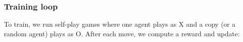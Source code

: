 \begin{Shaded}
\begin{Highlighting}[]
\OperatorTok{=}
        \NormalTok{:}
\OperatorTok{=}
             
\OperatorTok{=}
            \NormalTok{:}
\OperatorTok{=} \NormalTok{(}
\OperatorTok{=}\OperatorTok{+} \OperatorTok{*}

        \OperatorTok{+=} \OperatorTok{*}\OperatorTok{{-}}
\end{Highlighting}
\end{Shaded}

\hypertarget{training-loop}{%
\subsubsection{Training loop}\label{training-loop}}

To train, we run self-play games where one agent plays as X and a copy
(or a random agent) plays as O. After each move, we compute a reward and
update:

